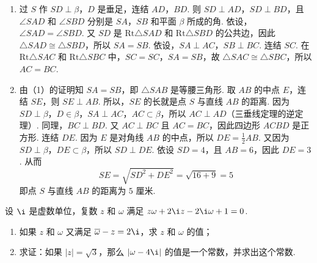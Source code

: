 \begin{solution}
\begin{enumerate}
\item 过 \(S\) 作 \(SD\perp \beta\)，\(D\) 是垂足，连结 \(AD\)，\(BD\). 则 \(SD\perp AD\)，\(SD\perp BD\)，且 \(\angle SAD\) 和 \(\angle SBD\) 分别是 \(SA\)，\(SB\) 和平面 \(\beta\) 所成的角. 依设，\(\angle SAD=\angle SBD\). 又 \(SD\) 是 \(\mathrm{Rt}\triangle SAD\) 和 \(\mathrm{Rt}\triangle SBD\) 的公共边，因此 \(\triangle SAD\cong \triangle SBD\)，所以 \(SA=SB\).
依设，\(SA\perp AC\)，\(SB\perp BC\). 连结 \(SC\). 在 \(\mathrm{Rt}\triangle SAC\) 和 \(\mathrm{Rt}\triangle SBC\) 中，\(SC=SC\)，\(SA=SB\)，故 \(\triangle SAC\cong \triangle SBC\)，所以 \(AC=BC\).

\item 由（1）的证明知 \(SA=SB\)，即 \(\triangle SAB\) 是等腰三角形. 取 \(AB\) 的中点 \(E\)，连结 \(SE\)，则 \(SE\perp AB\). 所以，\(SE\) 的长就是点 \(S\) 与直线 \(AB\) 的距离.
因为 \(SD\perp \beta\)，\(D\in \beta\)，\(SA\perp AC\)，\(AC\subset \beta\)，所以 \(AC\perp AD\)（三垂线定理的逆定理）. 同理，\(BC\perp BD\). 又 \(AC\perp BC\) 且 \(AC=BC\)，因此四边形 \(ACBD\) 是正方形.
连结 \(DE\). 因为 \(E\) 是对角线 \(AB\) 的中点，所以 \(DE=\frac{1}{2}AB\). 又因为 \(SD\perp \beta\)，\(DE\subset \beta\)，所以 \(SD\perp DE\). 依设 \(SD=4\)，且 \(AB=6\)，因此 \(DE=3\). 从而
\[
SE=\sqrt{SD^2+DE^2}=\sqrt{16+9}=5
\]
即点 \(S\) 与直线 \(AB\) 的距离为 \(5\text{ 厘米}\).
\end{enumerate}
\end{solution}

\begin{problem}
设 \(\i\) 是虚数单位，复数 \(z\) 和 \(\omega\) 满足 \(z\omega+2\i z-2\i\omega+1=0\).

\begin{enumerate}
\item 如果 \(z\) 和 \(\omega\) 又满足 \(\overline{\omega}-z=2\i\)，求 \(z\) 和 \(\omega\) 的值；
\item 求证：如果 \(\left| z \right|=\sqrt{3}\)，那么 \(\left| \omega-4\i \right|\) 的值是一个常数，并求出这个常数.
\end{enumerate}
\end{problem}

